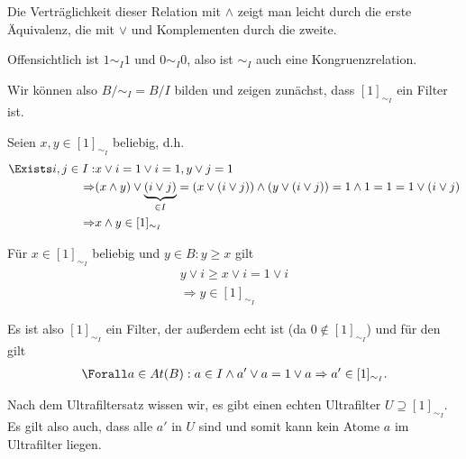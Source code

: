 \begin{solution}
Die Verträglichkeit dieser Relation mit $\land$ zeigt man leicht durch die erste Äquivalenz, die mit $\lor$ und Komplementen durch die zweite.

Offensichtlich ist $1 \sim_I 1$ und $0 \sim_I 0$, also ist $\sim_I$ auch eine Kongruenzrelation.

Wir können also $B/ \sim_I = B/I$ bilden und zeigen zunächst, dass $[1]_{\sim_I}$ ein Filter ist.

Seien $x,y \in [1]_{\sim_I}$ beliebig, d.h.
\begin{align*}
  \Exists i,j \in I: &x \lor i = 1 \lor i = 1, y \lor j = 1 \\
  \Rightarrow &(x \land y) \lor \underbrace{(i \lor j)}_{\in I} = (x \lor (i \lor j)) \land (y \lor (i \lor j)) = 1 \land 1 = 1 = 1 \lor (i \lor j) \\
  \Rightarrow &x \land y \in [1]_{\sim_I}
\end{align*}

Für $x \in [1]_{\sim_I}$ beliebig und $y \in B: y \geq x$ gilt
\begin{align*}
  y \lor i \geq x \lor i = 1 \lor i \\
  \Rightarrow y \in [1]_{\sim_I}
\end{align*}

Es ist also $[1]_{\sim_I}$ ein Filter, der außerdem echt ist (da $ 0 \notin [1]_{\sim_I}$) und für den gilt
\begin{align*}
  \Forall a \in At(B): a \in I \land a'  \lor a = 1 \lor a \Rightarrow a' \in [1]_{\sim_I}.
\end{align*}

Nach dem Ultrafiltersatz wissen wir, es gibt einen echten Ultrafilter $U \supseteq [1]_{\sim_I}$. Es gilt also auch, dass alle $a'$ in $U$ sind und somit kann kein Atome $a$ im Ultrafilter liegen.

\end{solution}
